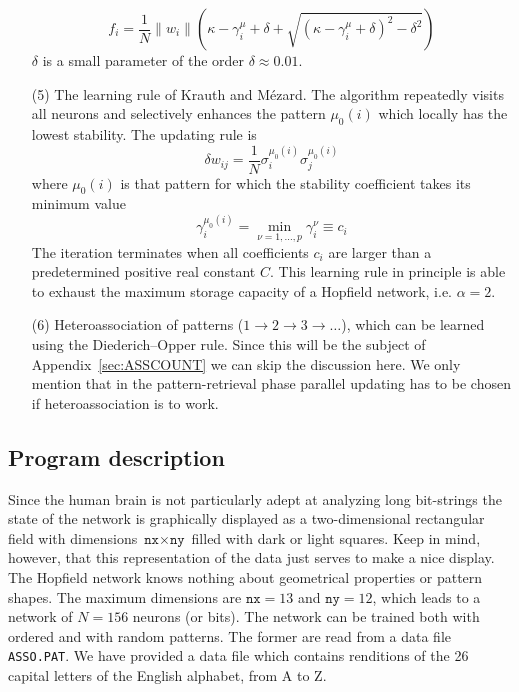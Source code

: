 \begin{itemize}
\begin{equation}
f_i=\frac{1}{N}\|w_i\|\left(\kappa-\gamma_i^\mu+\delta+\sqrt{{(\kappa-\gamma_i^\mu+\delta)}^2-\delta^2}\right)
\end{equation}
$\delta$ is a small parameter of the order $\delta\approx0.01$.
\item[(5)] The learning rule of Krauth and Mézard. The algorithm repeatedly visits all neurons and selectively enhances the pattern $\mu_0(i)$ which locally has the lowest stability. The updating rule is
\begin{equation}
\delta w_{ij}=\frac{1}{N}\sigma_i^{\mu_0(i)}\sigma_j^{\mu_0(i)}
\end{equation}
where $\mu_0(i)$ is that pattern for which the stability coefficient takes its minimum value
\begin{equation}
\gamma_i^{\mu_0(i)}=\min_{\nu=1,\ldots,p}{\gamma_i^\nu}\equiv c_i
\end{equation}
The iteration terminates when all coefficients $c_i$ are larger than a predetermined positive real constant $C$. This learning rule in principle is able to exhaust the maximum storage capacity of a Hopfield network, i.e. $\alpha=2$.
\item[(6)] Heteroassociation of patterns ($1\rightarrow2\rightarrow3\rightarrow\ldots$), which can be learned using the Diederich--Opper rule. Since this will be the subject of Appendix~\ref{sec:ASSCOUNT} we can skip the discussion here. We only mention that in the pattern-retrieval phase parallel updating has to be chosen if heteroassociation is to work.
\end{itemize}
\subsection{Program description}
Since the human brain is not particularly adept at analyzing long bit-strings the state of the network is graphically displayed as a two-dimensional rectangular field with dimensions $\texttt{nx}\times\texttt{ny}$ filled with dark or light squares. Keep in mind, however, that this representation of the data just serves to make a nice display. The Hopfield network knows nothing about geometrical properties or pattern shapes. The maximum dimensions are $\texttt{nx}=13$ and $\texttt{ny}=12$, which leads to a network of $N=156$ neurons (or bits). The network can be trained both with ordered and with random patterns. The former are read from a data file \texttt{ASSO.PAT}. We have provided a data file which contains renditions of the 26 capital letters of the English alphabet, from A to Z.

